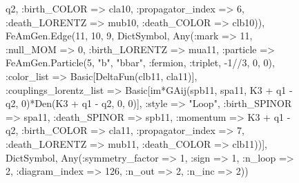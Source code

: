 \documentclass{revtex4}
\begin{document}
\begin{figure}[!htb]
\begin{center}
{q2, :birth_COLOR => cla10, :propagator_index => 6, :death_LORENTZ => mub10, :death_COLOR => clb10)), FeAmGen.Edge(11, 10, 9, Dict{Symbol, Any}(:mark => 11, :null_MOM => 0, :birth_LORENTZ => mua11, :particle => FeAmGen.Particle(5, "b", "bbar", :fermion, :triplet, -1//3, 0, 0), :color_list => Basic[DeltaFun(clb11, cla11)], :couplings_lorentz_list => Basic[im*GAij(spb11, spa11, K3 + q1 - q2, 0)*Den(K3 + q1 - q2, 0, 0)], :style => "Loop", :birth_SPINOR => spa11, :death_SPINOR => spb11, :momentum => K3 + q1 - q2, :birth_COLOR => cla11, :propagator_index => 7, :death_LORENTZ => mub11, :death_COLOR => clb11))], Dict{Symbol, Any}(:symmetry_factor => 1, :sign => 1, :n_loop => 2, :diagram_index => 126, :n_out => 2, :n_inc => 2)) 
}
\end{center}
\end{figure}
\end{document}

